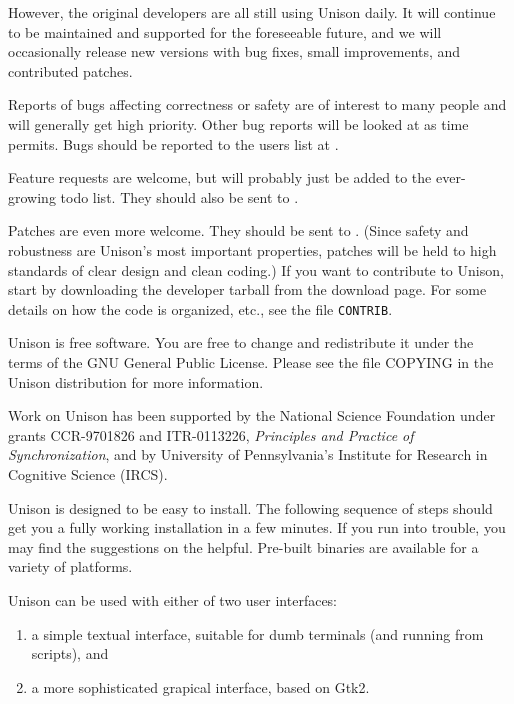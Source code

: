 \documentclass{article}
\begin{document}
However, the original developers are all still using Unison daily.  It
will continue to be maintained and supported for the foreseeable future,
and we will occasionally release new versions with bug fixes, small
improvements, and contributed patches.

Reports of bugs affecting correctness or safety are of interest to many
people and will generally get high priority.  Other bug reports will be
looked at as time permits.  Bugs should be reported to the users list at
\UNISONUSERS. 

Feature requests are welcome, but will probably just be added to the
ever-growing todo list.  They should also be sent to \UNISONUSERS.

Patches are even more welcome.  They should be sent to
\UNISONHACKERS.
(Since safety and robustness are Unison's most important properties,
patches will be held to high standards of clear design and clean coding.)
If you want to contribute to Unison, start by downloading the developer
tarball from the download page.  For some details on how the code is
organized, etc., see the file {\tt CONTRIB}.


Unison is free software.  You are free to change and redistribute it
under the terms of the GNU General Public License.  Please see the
file COPYING in the Unison distribution for more information.


Work on Unison has been supported by the National Science Foundation
under grants CCR-9701826 and ITR-0113226, {\em Principles and Practice of
  Synchronization}, and by University of Pennsylvania's Institute for
Research in Cognitive Science (IRCS).


Unison is designed to be easy to install.  The following sequence of
steps should get you a fully working installation in a few minutes.  If
you run into trouble, you may find the suggestions on the 
 helpful.  Pre-built binaries are available for a
variety of platforms.

Unison can be used with either of two user interfaces: 
\begin{enumerate}
\item a simple textual interface, suitable for dumb terminals (and
running from scripts), and 
\item a more sophisticated grapical interface, based on Gtk2.  
\end{enumerate}
\end{document}
